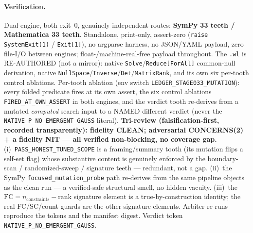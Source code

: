 \paragraph{Verification.}
Dual-engine, both exit~0, genuinely independent routes: \textbf{SymPy 33 teeth /
Mathematica 33 teeth}. Standalone, print-only, assert-zero
(\texttt{raise SystemExit(1)} / \texttt{Exit[1]}), no argparse harness, no
JSON/YAML payload, zero file-I/O between engines; float-/machine-real-free payload
throughout. The \texttt{.wl} is RE-AUTHORED (not a mirror): native
\texttt{Solve}/\texttt{Reduce[ForAll]} common-null derivation, native
\texttt{NullSpace}/\texttt{Inverse}/\texttt{Det}/\texttt{MatrixRank}, and its own
six per-tooth control ablations. Per-tooth ablation (env switch
\texttt{LEDGER\_STAGE033\_MUTATION}): every folded predicate fires at its own
assert, the six control ablations \texttt{FIRED\_AT\_OWN\_ASSERT} in both engines,
and the verdict tooth re-derives from a mutated \emph{computed} search input to a
NAMED different verdict (never the \texttt{NATIVE\_P\_NO\_EMERGENT\_GAUSS} literal).
\textbf{Tri-review (falsification-first, recorded transparently): fidelity CLEAN;
adversarial CONCERNS(2) + a fidelity NIT --- all verified non-blocking, no coverage
gap.} (i)~\texttt{PASS\_HONEST\_TUNED\_SCOPE} is a framing/summary tooth (its
mutation flips a self-set flag) whose substantive content is genuinely enforced by
the boundary-scan / randomized-sweep / signature teeth --- redundant, not a gap.
(ii)~the SymPy \texttt{focused\_mutation\_probe} path re-derives from the same
pipeline objects as the clean run --- a verified-safe structural smell, no hidden
vacuity. (iii)~the \(\mathrm{FC}=n_{\mathrm{constraints}}-\mathrm{rank}\) signature
element is a true-by-construction identity; the real FC/SC/count guards are the
other signature elements. Arbiter re-runs reproduce the tokens and the manifest
digest. Verdict token \texttt{NATIVE\_P\_NO\_EMERGENT\_GAUSS}.
